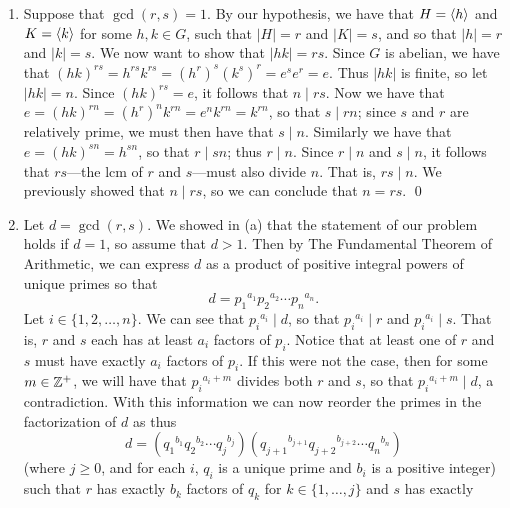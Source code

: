 \begin{enumerate}
      \begin{enumerate}
         \item Suppose that $\gcd(r, s) = 1$. By our hypothesis, we have that
               $H = \langle h \rangle$ and $K = \langle k \rangle$ for some $h, k \in G$, such that
               $|H| = r$ and $|K| = s$, and so that $|h| = r$ and $|k| = s$. We
               now want to show that $|hk| = rs$. Since $G$ is abelian, we have
               that $(hk)^{rs} = h^{rs}k^{rs} = (h^r)^s(k^s)^r = e^se^r = e$.
               Thus $|hk|$ is finite, so let $|hk| = n$. Since $(hk)^{rs} = e$,
               it follows that $n \mid rs$. Now we have that
               $e = (hk)^{rn} = (h^r)^nk^{rn} = e^nk^{rn} = k^{rn}$, so that
               $s \mid rn$; since $s$ and $r$ are relatively prime, we must then
               have that $s \mid n$. Similarly we have that
               $e = (hk)^{sn} = h^{sn}$, so that $r \mid sn$; thus $r \mid n$.
               Since $r \mid n$ and $s \mid n$, it follows that $rs$---the lcm 
               of $r$ and $s$---must also divide $n$. That is, $rs \mid n$. We
               previously showed that $n \mid rs$, so we can conclude that
               $n = rs$. \qed
         \item Let $d = \gcd(r, s)$. We showed in (a) that the statement of our
               problem holds if $d = 1$, so assume that $d > 1$. Then by The 
               Fundamental Theorem of Arithmetic, we can express $d$ as a 
               product of positive integral powers of unique primes so that
               $$d = {p_1}^{a_1}{p_2}^{a_2} \cdots {p_n}^{a_n}.$$
               Let $i \in \{1, 2, \ldots, n\}$. We can see that
               ${p_i}^{a_i} \mid d$, so that ${p_i}^{a_i} \mid r$ and
               ${p_i}^{a_i} \mid s$. That is, $r$ and $s$ each has at least
               $a_i$ factors of $p_i$. Notice that at least one of $r$ and $s$ 
               must have exactly $a_i$ factors of $p_i$. If this were not the 
               case, then for some $m \in \mathbb{Z}^+$, we will have that
               ${p_i}^{a_i + m}$ divides both $r$ and $s$, so that
               ${p_i}^{a_i + m} \mid d$, a contradiction. With this information 
               we can now reorder the primes in the factorization of $d$ as thus
               $$d = ({q_1}^{b_1}{q_2}^{b_2}\cdots {q_j}^{b_j})
                   ({q_{j+1}}^{b_{j+1}}{q_{j+2}}^{b_{j+2}}\cdots {q_n}^{b_n})$$
               (where $j \ge 0$, and for each $i$, $q_i$ is a unique prime and 
               $b_i$ is a positive integer) such that $r$ has exactly $b_k$
               factors of $q_k$ for $k \in \{1, \ldots, j\}$ and $s$ has exactly

\end{enumerate}
\end{enumerate}
